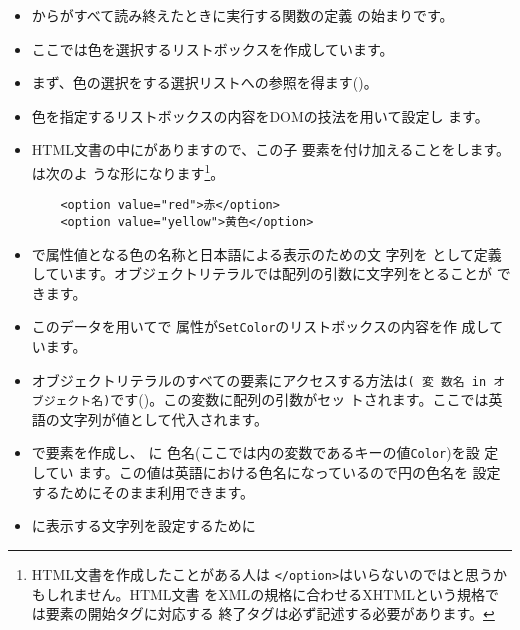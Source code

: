 \begin{itemize}
 \item {}から\HTML がすべて読み終えたときに実行する関数の定義
       の始まりです。
  \item ここでは色を選択するリストボックスを作成しています。
 \item まず、色の選択をする選択リストへの参照を得ます()。
  \item 色を指定するリストボックスの内容をDOMの技法を用いて設定し
       ます。
 \item HTML文書の中にがありますので、この子
       要素を付け加えることをします。は次のよ
       うな形になります\footnote{HTML文書を作成したことがある人は
       \texttt{</option>}はいらないのではと思うかもしれません。HTML文書
       をXMLの規格に合わせるXHTMLという規格では要素の開始タグに対応する
       終了タグは必ず記述する必要があります。}。
\begin{Verbatim}
	<option value="red">赤</option>
	<option value="yellow">黄色</option>
\end{Verbatim}
 \item {}で属性値となる色の名称と日本語による表示のための文
       字列を
       として定義しています。オブジェクトリテラルでは配列の引数に文字列をとることが
       できます。
\iffalse
       左側にある文字列は\keysub{キー}{オブジェクトリテラル}{の}と呼
       ばれます。\texttt{:}をはさんだ右側はこのキーにおける値であり、こ
       こには任意の\JS のオブジェクトを記述できます。値は「オブジェクト
       名[キー]」の
       形で取り扱うことができます(\Line{createTextNode}参照)。
\fi
 \item このデータを用いてで
       属性が\texttt{SetColor}のリストボックスの内容を作
       成しています。
 \item オブジェクトリテラルのすべての要素にアクセスする方法は\texttt{( 変
       数名 in オブジェクト名)}です()。この変数に配列の引数がセッ
       トされます。ここでは英語の文字列が値として代入されます。
 \item {}で要素を作成し、
       に
       色名(ここでは内の変数であるキーの値\texttt{Color})を設
       定してい ます。この値は英語における色名になっているので円の色名を
       設定するためにそのまま利用できます。
 \item {}に表示する文字列を設定するために

\end{itemize}
